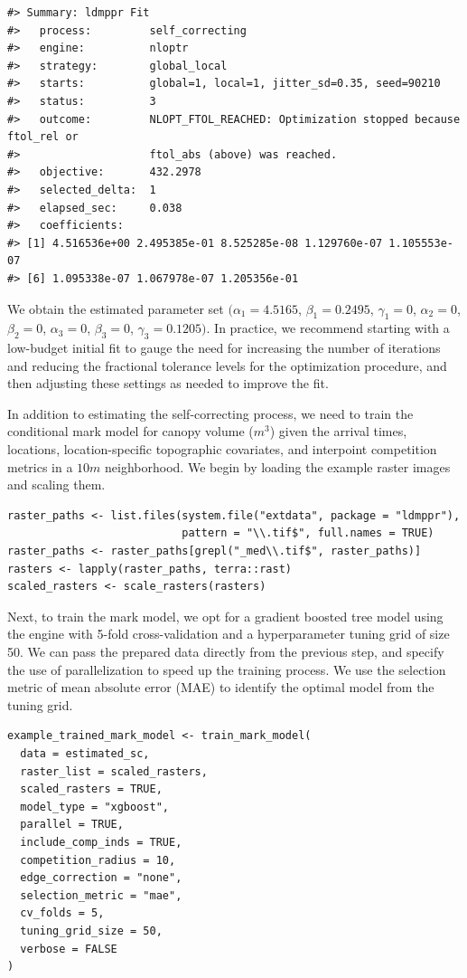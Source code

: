 \begin{verbatim}
#> Summary: ldmppr Fit
#>   process:         self_correcting
#>   engine:          nloptr
#>   strategy:        global_local
#>   starts:          global=1, local=1, jitter_sd=0.35, seed=90210
#>   status:          3
#>   outcome:         NLOPT_FTOL_REACHED: Optimization stopped because ftol_rel or
#>                    ftol_abs (above) was reached.
#>   objective:       432.2978
#>   selected_delta:  1
#>   elapsed_sec:     0.038
#>   coefficients:
#> [1] 4.516536e+00 2.495385e-01 8.525285e-08 1.129760e-07 1.105553e-07
#> [6] 1.095338e-07 1.067978e-07 1.205356e-01
\end{verbatim}

We obtain the estimated parameter set
\((\alpha_1 = 4.5165\),
\(\beta_1 = 0.2495\),
\(\gamma_1 = 0\),
\(\alpha_2 = 0\),
\(\beta_2 = 0\),
\(\alpha_3 = 0\),
\(\beta_3 = 0\),
\(\gamma_3 = 0.1205)\). In practice, we
recommend starting with a low-budget initial fit to gauge the need for increasing the number of iterations and reducing the
fractional tolerance levels for the optimization procedure, and then adjusting these settings as needed to improve the fit.

In addition to estimating the self-correcting process, we need to train
the conditional mark model for canopy volume (\(m^3\)) given the arrival
times, locations, location-specific topographic covariates, and
interpoint competition metrics in a \(10m\) neighborhood. We begin by
loading the example raster images and scaling them.

\begin{verbatim}
raster_paths <- list.files(system.file("extdata", package = "ldmppr"),
                           pattern = "\\.tif$", full.names = TRUE)
raster_paths <- raster_paths[grepl("_med\\.tif$", raster_paths)]
rasters <- lapply(raster_paths, terra::rast)
scaled_rasters <- scale_rasters(rasters)
\end{verbatim}

Next, to train the mark model, {we opt for a gradient boosted tree model
using the  engine with 5-fold cross-validation and a hyperparameter tuning grid of size 50. We can pass the prepared data directly from the previous step, and specify the use of parallelization to speed up the training process. We use the selection metric of mean absolute error (MAE) to identify the optimal model from the tuning grid.}

\begin{verbatim}
example_trained_mark_model <- train_mark_model(
  data = estimated_sc,
  raster_list = scaled_rasters,
  scaled_rasters = TRUE,
  model_type = "xgboost",
  parallel = TRUE,
  include_comp_inds = TRUE,
  competition_radius = 10,
  edge_correction = "none",
  selection_metric = "mae",
  cv_folds = 5,
  tuning_grid_size = 50,
  verbose = FALSE
)
\end{verbatim}

